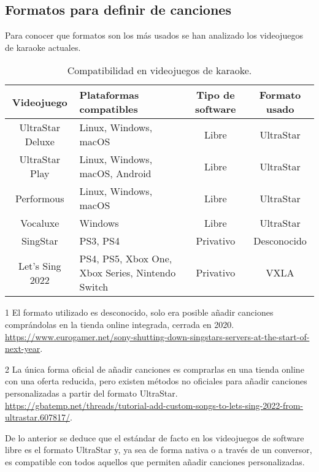 \subsection{Formatos para definir de canciones}
\label{sec:formatcomparison}

Para conocer que formatos son los más usados se han analizado los videojuegos de karaoke actuales.

\begin{table}[h!]
	\begin{threeparttable}
		\caption{Compatibilidad en videojuegos de karaoke.}
		\begin{tabular}{ |c|>{\centering\arraybackslash}m{}|c|c|}
			\hline
			\textbf{Videojuego} & \textbf{Plataformas compatibles} & \textbf{Tipo de software} & \textbf{Formato usado} \\
			\hline
			UltraStar Deluxe & Linux, Windows, macOS & Libre & UltraStar \\
			UltraStar Play & Linux, Windows, macOS, Android & Libre & UltraStar \\
			Performous & Linux, Windows, macOS & Libre & UltraStar \\
			Vocaluxe & Windows & Libre & UltraStar \\
			SingStar & PS3, PS4 & Privativo & Desconocido\tnote{1} \\
			Let's Sing 2022 & PS4, PS5, Xbox One, Xbox Series, Nintendo Switch & Privativo & VXLA\tnote{2} \\
			\hline
		\end{tabular}
		\begin{tablenotes}
			\item [1] El formato utilizado es desconocido, solo era posible añadir canciones comprándolas en la tienda online integrada, cerrada en 2020. \url{https://www.eurogamer.net/sony-shutting-down-singstars-servers-at-the-start-of-next-year}.
			\item [2] La única forma oficial de añadir canciones es comprarlas en una tienda online con una oferta reducida, pero existen métodos no oficiales para añadir canciones personalizadas a partir del formato UltraStar.  \url{https://gbatemp.net/threads/tutorial-add-custom-songs-to-lets-sing-2022-from-ultrastar.607817/}.
		\end{tablenotes}
	\end{threeparttable}
\end{table}

De lo anterior se deduce que el estándar de facto en los videojuegos de software libre es el formato UltraStar y, ya sea de forma nativa o a través de un conversor, es compatible con todos aquellos que permiten añadir canciones personalizadas.



